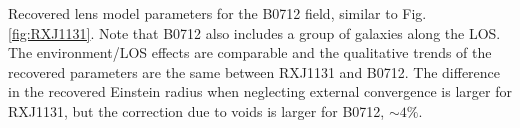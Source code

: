 \label{fig:B0712} Recovered lens model parameters for the B0712 field, similar to Fig. \ref{fig:RXJ1131}. Note that B0712 also includes a group of galaxies along the LOS. The environment/LOS effects are comparable and the qualitative trends of the recovered parameters are the same between RXJ1131 and B0712. The difference in the recovered Einstein radius when neglecting external convergence is larger for RXJ1131, but the correction due to voids is larger for B0712, $\sim4\%$.